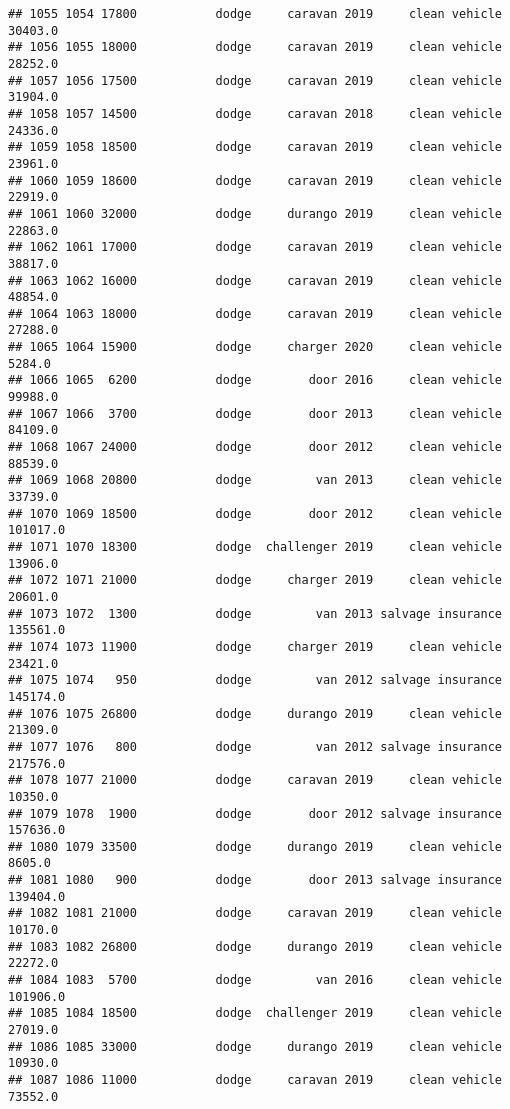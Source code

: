 \documentclass[
]{article}
\begin{document}
\begin{verbatim}
## 1055 1054 17800           dodge     caravan 2019     clean vehicle   30403.0
## 1056 1055 18000           dodge     caravan 2019     clean vehicle   28252.0
## 1057 1056 17500           dodge     caravan 2019     clean vehicle   31904.0
## 1058 1057 14500           dodge     caravan 2018     clean vehicle   24336.0
## 1059 1058 18500           dodge     caravan 2019     clean vehicle   23961.0
## 1060 1059 18600           dodge     caravan 2019     clean vehicle   22919.0
## 1061 1060 32000           dodge     durango 2019     clean vehicle   22863.0
## 1062 1061 17000           dodge     caravan 2019     clean vehicle   38817.0
## 1063 1062 16000           dodge     caravan 2019     clean vehicle   48854.0
## 1064 1063 18000           dodge     caravan 2019     clean vehicle   27288.0
## 1065 1064 15900           dodge     charger 2020     clean vehicle    5284.0
## 1066 1065  6200           dodge        door 2016     clean vehicle   99988.0
## 1067 1066  3700           dodge        door 2013     clean vehicle   84109.0
## 1068 1067 24000           dodge        door 2012     clean vehicle   88539.0
## 1069 1068 20800           dodge         van 2013     clean vehicle   33739.0
## 1070 1069 18500           dodge        door 2012     clean vehicle  101017.0
## 1071 1070 18300           dodge  challenger 2019     clean vehicle   13906.0
## 1072 1071 21000           dodge     charger 2019     clean vehicle   20601.0
## 1073 1072  1300           dodge         van 2013 salvage insurance  135561.0
## 1074 1073 11900           dodge     charger 2019     clean vehicle   23421.0
## 1075 1074   950           dodge         van 2012 salvage insurance  145174.0
## 1076 1075 26800           dodge     durango 2019     clean vehicle   21309.0
## 1077 1076   800           dodge         van 2012 salvage insurance  217576.0
## 1078 1077 21000           dodge     caravan 2019     clean vehicle   10350.0
## 1079 1078  1900           dodge        door 2012 salvage insurance  157636.0
## 1080 1079 33500           dodge     durango 2019     clean vehicle    8605.0
## 1081 1080   900           dodge        door 2013 salvage insurance  139404.0
## 1082 1081 21000           dodge     caravan 2019     clean vehicle   10170.0
## 1083 1082 26800           dodge     durango 2019     clean vehicle   22272.0
## 1084 1083  5700           dodge         van 2016     clean vehicle  101906.0
## 1085 1084 18500           dodge  challenger 2019     clean vehicle   27019.0
## 1086 1085 33000           dodge     durango 2019     clean vehicle   10930.0
## 1087 1086 11000           dodge     caravan 2019     clean vehicle   73552.0

\end{verbatim}
\end{document}
